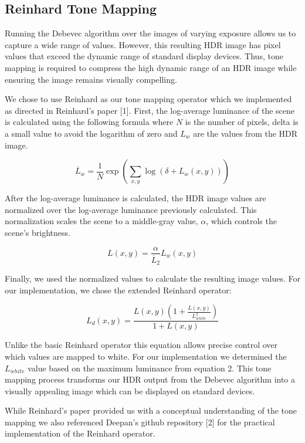 \documentclass[
	a4paper, %
	10pt, %
	unnumberedsections, %
	twoside, %
]{LTJournalArticle}
\begin{document}
\subsection{Reinhard Tone Mapping}
Running the Debevec algorithm over the images of varying exposure allows us to capture a wide range of values. However, this resulting HDR image has pixel values that exceed the dynamic range of standard display devices. Thus, tone mapping is required to compress the high dynamic range of an HDR image while ensuring the image remains visually compelling. 

We chose to use Reinhard as our tone mapping operator which we implemented as directed in Reinhard's paper [1]. First, the log-average luminance of the scene is calculated using the following formula where $N$ is the number of pixels, delta is a small value to avoid the logarithm of zero and $L_w$ are the values from the HDR image.

\begin{equation}
	\overline{L}_w = \frac{1}{N} \exp\left( \sum_{x,y} \log(\delta + L_w(x,y))\right)
\end{equation}

After the log-average luminance is calculated, the HDR image values are normalized over the log-average luminance previously calculated. This normalization scales the scene to a middle-gray value, $\alpha$, which controls the scene's brightness. 

\begin{equation}
	L(x,y) = \frac{\alpha}{\overline{L}_2} L_w(x,y)
\end{equation}

Finally, we used the normalized values to calculate the resulting image values. For our implementation, we chose the extended Reinhard operator:

\begin{equation}
	L_d(x,y) = \frac{L(x,y)(1 + \frac{L(x,y)}{L^2_{white}})}{1 + L(x,y)}
\end{equation}

Unlike the basic Reinhard operator this equation allows precise control over which values are mapped to white. For our implementation we determined the $L_{white}$ value based on the maximum luminance from equation 2. This tone mapping process transforms our HDR output from the Debevec algorithm into a visually appealing image which can be displayed on standard devices.

While Reinhard’s paper provided us with a conceptual understanding of the tone mapping we also referenced Deepan’s github repository [2] for the practical implementation of the Reinhard operator.
\end{document}
